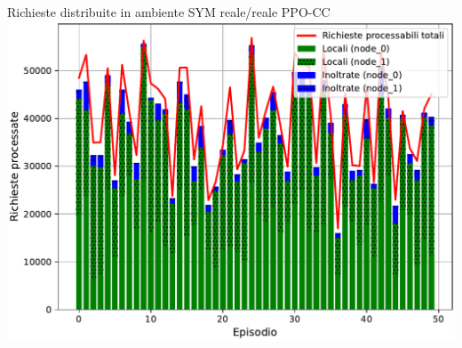 \documentclass[]{beamer}
\begin{document}
\begin{frame}{Richieste distribuite in ambiente SYM reale/reale PPO-CC}
    \centering
    \includegraphics[width=.95\linewidth]{assets/5/results/real_real_ppo_cc_proc_reqs_abs.pdf}
\end{frame}
\end{document}
